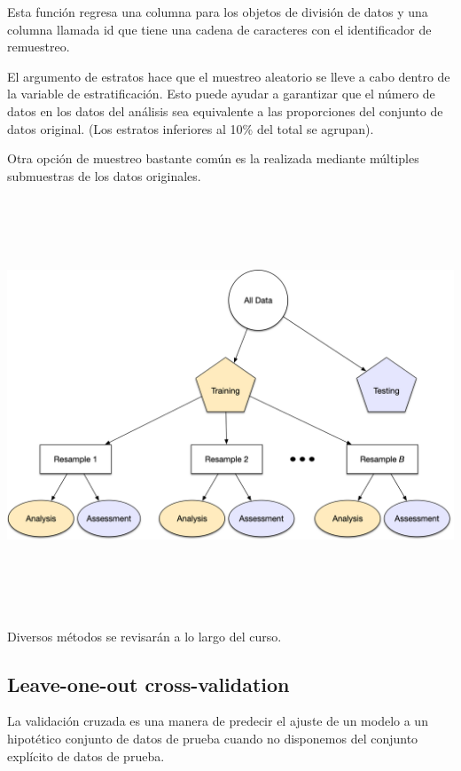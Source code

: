 \documentclass[
]{book}
\begin{document}
Esta función regresa una columna para los objetos de división de datos y una columna llamada id que tiene una cadena de caracteres con el identificador de remuestreo.

El argumento de estratos hace que el muestreo aleatorio se lleve a cabo dentro de la variable de estratificación. Esto puede ayudar a garantizar que el número de datos en los datos del análisis sea equivalente a las proporciones del conjunto de datos original. (Los estratos inferiores al 10\% del total se agrupan).

Otra opción de muestreo bastante común es la realizada mediante múltiples submuestras de los datos originales.

\begin{center}\includegraphics[width=500pt,height=350pt]{img/04-ml/18_1_cross_validation} \end{center}

Diversos métodos se revisarán a lo largo del curso.

\hypertarget{leave-one-out-cross-validation}{%
\subsection{Leave-one-out cross-validation}\label{leave-one-out-cross-validation}}

La validación cruzada es una manera de predecir el ajuste de un modelo a un hipotético conjunto de datos de prueba cuando no disponemos del conjunto explícito de datos de prueba.
\end{document}
